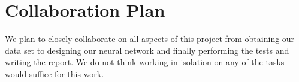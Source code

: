 \documentclass{article} %
\begin{document}
\section{Collaboration Plan}
\vspace{-.2cm}
We plan to closely collaborate on all aspects of this project from obtaining our data set 
to designing our neural network and finally performing the tests and writing the report. We do not
think working in isolation on any of the tasks would suffice for this work.
%
%
%
%
%
%
%
\printbibliography
\end{document}
